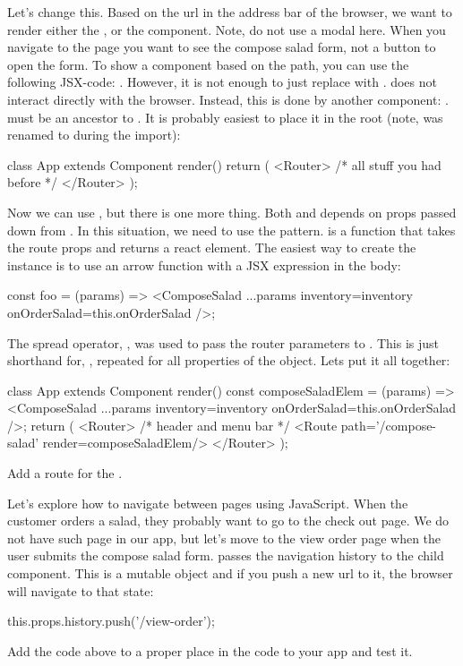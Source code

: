 \documentclass[fleqn, article, a4paper]{memoir}
\begin{document}
\begin{Assignments}
\item Let's change this. Based on the url in the address bar of the browser, we want to render either the , or the  component. Note, do not use a modal here. When you navigate to the page you want to see the compose salad form, not a button to open the form. To show a component based on the path, you can use the following JSX-code: . However, it is not enough to just replace  with .  does not interact directly with the browser. Instead, this is done by another component: .  must be an ancestor to . It is probably easiest to place it in the root (note,  was renamed to  during the import):
\begin{Code}
class App extends Component {
  render() {
    return (
      <Router>
        {/* all stuff you had before */}
      </Router>
    );
  }
}
\end{Code}
Now we can use , but there is one more thing. Both  and  depends on props passed down from . In this situation, we need to use the  pattern.  is a function that takes the route props and returns a react element. The easiest way to create the instance is to use an arrow function with a JSX expression in the body:
\begin{Code}
const foo = (params) => <ComposeSalad {...params} inventory={inventory} 
  onOrderSalad={this.onOrderSalad} />;
\end{Code}
The spread operator, , was used to pass the router parameters to . This is just shorthand for, , repeated for all properties of the  object. Lets put it all together:
\begin{Code}
class App extends Component {
  render() {
    const composeSaladElem = (params) => <ComposeSalad {...params} inventory={inventory} 
                       onOrderSalad={this.onOrderSalad} />;
    return (
      <Router>
        {/* header and menu bar */}
        <Route path='/compose-salad' render={composeSaladElem}/>
      </Router>
    );
  }
}
\end{Code}
Add a route for the .

\item Let's explore how to navigate between pages using JavaScript. When the customer orders a salad, they probably want to go to the check out page. We do not have such page in our app, but let's move to the view order page when the user submits the compose salad form.  passes the navigation history to the child component. This is a mutable object and if you push a new url to it, the browser will navigate to that state:
\begin{Code}
this.props.history.push('/view-order');
\end{Code}
Add the code above to a proper place in the code to your app and test it.


\end{Assignments}
\end{document}

